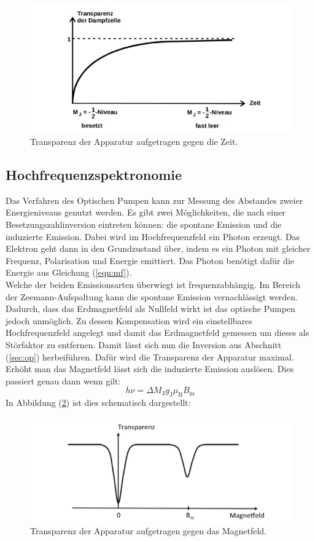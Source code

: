 \begin{figure}[h!]
  \centering
  \includegraphics[scale=0.7]{fig/12.png}
  \caption{Transparenz der Apparatur aufgetragen gegen die Zeit.}
  \label{fig:12}
\end{figure}
\subsection{Hochfrequenzspektronomie}
\label{sec:hfsp}
Das Verfahren des Optischen Pumpen kann zur Messung des Abstandes zweier Energieniveaus genutzt werden. Es gibt zwei Möglichkeiten, die nach einer Besetzungszahlinversion eintreten können: die spontane Emission und die induzierte Emission. Dabei wird im Hochfrequenzfeld ein Photon erzeugt. Das Elektron geht dann in den Grundzustand über, indem es ein Photon mit gleicher Frequenz, Polarisation und Energie emittiert. Das Photon benötigt dafür die Energie aus Gleichung (\ref{eqn:mf}). \\
Welche der beiden Emissionsarten überwiegt ist frequenzabhängig. Im Bereich der Zeemann-Aufspaltung kann die spontane Emission vernachlässigt werden. Dadurch, dass das Erdmagnetfeld als Nullfeld wirkt ist das optische Pumpen jedoch unmöglich. Zu dessen Kompensation wird ein einstellbares Hochfrequenzfeld angelegt und damit das Erdmagnetfeld gemessen um dieses als Störfaktor zu entfernen. Damit lässt sich nun die Inversion aus Abschnitt (\ref{sec:op}) herbeiführen.
Dafür wird die Transparenz der Apparatur maximal. Erhöht man das Magnetfeld lässt sich die induzierte Emission auslösen. Dies passiert genau dann wenn gilt:
\begin{equation}
  \label{eqn:bm}
  h\nu=\Delta M_\mathrm{J}g_\mathrm{J}\mu_\mathrm{B}B_\mathrm{m}
\end{equation}
In Abbildung (\ref{fig:transpa}) ist dies schematisch dargestellt:
\begin{figure}[h!]
  \centering
  \includegraphics[scale=0.5]{fig/transpa.png}
  \caption{Transparenz der Apparatur aufgetragen gegen das Magnetfeld.}
  \label{fig:transpa}
\end{figure}
